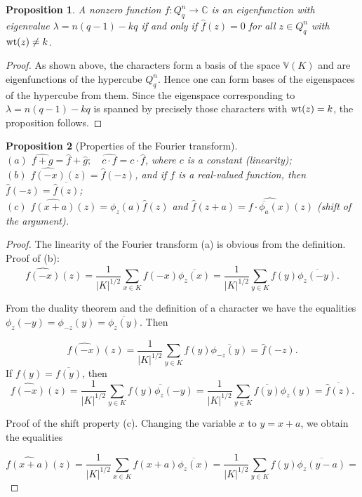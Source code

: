 \documentclass[11pt]{article}
\newtheorem{claim}{Proposition}[section]
\theoremstyle{definition}
\newcommand{\wt}{{\rm wt}}
\begin{document}
{{{\begin{claim}\label{claim:ef}
A nonzero function $f:Q^n_q\rightarrow \mathbb{C}$ is an eigenfunction with eigenvalue $\lambda=n(q-1)-kq$ if and only if $\widehat{f}(z)=0$ for all $z\in Q^n_q$ with $\wt(z)\neq k$.
\end{claim}
\begin{proof}
As shown above, the characters form a basis of the space $\mathbb{V}(K)$ and are eigenfunctions of the hypercube $Q^n_q$. Hence one can form bases of the eigenspaces of the hypercube from them.
Since the eigenspace corresponding to $\lambda=n(q-1)-kq$ is spanned by precisely those characters with
  $\wt(z)= k$, the proposition follows.
\end{proof}

\begin{claim}[Properties of the Fourier transform]\label{cl:Four1-3} \quad
\\
 $(a)$ $ \widehat{f+g}=\widehat{f}+\widehat{g};\quad
 \widehat{c\cdot f}=c\cdot\widehat{f}$, where $c$ is a constant \quad
 (linearity);\\
$(b)$ $\widehat{f(-x)}(z)=\widehat{f}(-z)$, and if $f$ is a real-valued function, then
$\widehat{f}(-z)=\overline{\widehat{f}(z)}$;\\
 $(c)$
$\widehat{f(x+a)}(z)=\phi_z(a)\widehat{f}(z)$ and
$\widehat{f}(z+a)=\widehat{f\cdot\overline{\phi_a}(x)}(z)$ \quad
(shift of the argument).
\end{claim}
\begin{proof}
The linearity of the Fourier transform (a) is obvious from the definition.
Proof of (b):
\[\widehat{f(-x)}(z)=\frac{1}{|K|^{1/2}}\sum\limits_{x\in
K}f(-x)\overline{\phi_z(x)}=\frac{1}{|K|^{1/2}}\sum\limits_{y\in
K}f(y)\overline{\phi_z(-y)}.\]

From the duality theorem and the definition of a character we have the equalities
$\phi_z(-y)=\phi_{-z}(y)=\overline{\phi_z(y)}$. Then

\[\widehat{f(-x)}(z)=\frac{1}{|K|^{1/2}}\sum\limits_{y\in
K}f(y)\overline{\phi_{-z}(y)}=\widehat{f}(-z).\] If
$f(y)=\overline{f(y)}$, then
\[\widehat{f(-x)}(z)=\frac{1}{|K|^{1/2}}\sum\limits_{y\in
K}\overline{f(y)\phi_{z}(-y)}=\frac{1}{|K|^{1/2}}\sum\limits_{y\in
K}\overline{f(y)}\phi_{z}(y)=\overline{\widehat{f}(z)}.\]


 Proof of the shift property (c).
Changing the variable $x$ to $y=x+a$, we obtain the equalities

\[ \widehat{f(x+a)}(z)=\frac{1}{|K|^{1/2}}\sum\limits_{x\in K}f(x+a)\overline{\phi_z(x)}=\frac{1}{|K|^{1/2}}\sum\limits_{y\in K}f(y)\overline{\phi_z(y-a)}= \]


\end{proof}}}}
\end{document}
